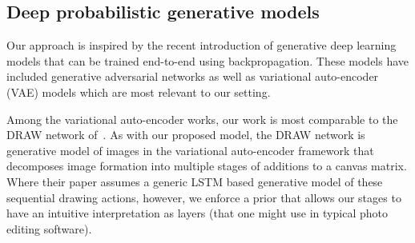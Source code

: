 \label{sec:related}



\subsection{Deep probabilistic generative models}

Our approach is inspired by the recent introduction of generative deep learning models that can be
trained end-to-end using backpropagation.  These models have included
generative adversarial networks \citep{denton2015deep, goodfellow2014generative}
as well as variational auto-encoder (VAE) models \citep{Kingma2014,kingma2014semi,rezende2014stochastic,burda2015importance}
which are most relevant to our setting.  

Among the variational auto-encoder works, our work is most comparable to 
the DRAW network of~\cite{gregor2015draw}.  As with our proposed model, 
the DRAW network is generative model of images in the variational auto-encoder framework
that decomposes image formation into multiple stages of additions to a canvas matrix.  
Where their paper assumes a generic LSTM based generative model of these sequential 
drawing actions, however, we enforce a prior that allows our stages to have an intuitive interpretation
as layers (that one might use in typical photo editing software).


		
	

